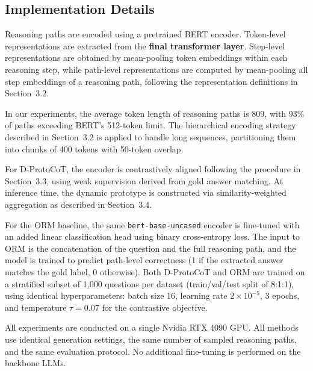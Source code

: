 \documentclass[a4paper,fleqn]{cas-dc}
\begin{document}
\subsection{Implementation Details}

Reasoning paths are encoded using a pretrained BERT encoder. Token-level representations are extracted from the \textbf{final transformer layer}. Step-level representations are obtained by mean-pooling token embeddings within each reasoning step, while path-level representations are computed by mean-pooling all step embeddings of a reasoning path, following the representation definitions in Section~3.2.

In our experiments, the average token length of reasoning paths is 809, with 93\% of paths exceeding BERT's 512-token limit. The hierarchical encoding strategy described in Section~3.2 is applied to handle long sequences, partitioning them into chunks of 400 tokens with 50-token overlap.

For D-ProtoCoT, the encoder is contrastively aligned following the procedure in Section~3.3, using weak supervision derived from gold answer matching. At inference time, the dynamic prototype is constructed via similarity-weighted aggregation as described in Section~3.4.

For the ORM baseline, the same \texttt{bert-base-uncased} encoder is fine-tuned with an added linear classification head using binary cross-entropy loss. The input to ORM is the concatenation of the question and the full reasoning path, and the model is trained to predict path-level correctness (1 if the extracted answer matches the gold label, 0 otherwise). Both D-ProtoCoT and ORM are trained on a stratified subset of 1{,}000 questions per dataset (train/val/test split of 8:1:1), using identical hyperparameters: batch size 16, learning rate $2{\times}10^{-5}$, 3 epochs, and temperature $\tau{=}0.07$ for the contrastive objective.

All experiments are conducted on a single Nvidia RTX 4090 GPU. All methods use identical generation settings, the same number of sampled reasoning paths, and the same evaluation protocol. No additional fine-tuning is performed on the backbone LLMs.
\end{document}
